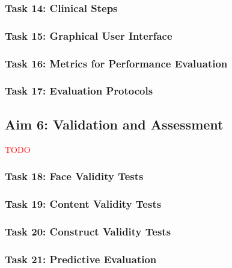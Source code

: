 \subsubsection{Task 14: Clinical Steps}
\subsubsection{Task 15: Graphical User Interface}
\subsubsection{Task 16: Metrics for Performance Evaluation}
\subsubsection{Task 17: Evaluation Protocols}

\subsection{Aim 6: Validation and Assessment}
\textcolor{Red}{TODO}

\subsubsection{Task 18: Face Validity Tests}
\subsubsection{Task 19: Content Validity Tests}
\subsubsection{Task 20: Construct Validity Tests}
\subsubsection{Task 21: Predictive Evaluation}
